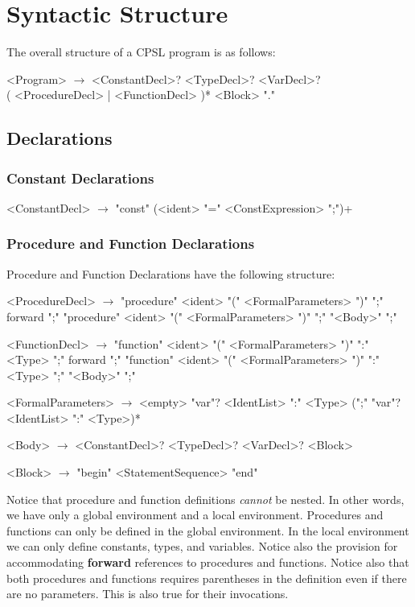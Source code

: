 \documentclass{book}
\begin{document}
\chapter{Syntactic Structure}
The overall structure of a CPSL program is as follows:
\begin{grammar}
<Program> $\rightarrow$ <ConstantDecl>? <TypeDecl>? <VarDecl>? \\
( <ProcedureDecl> | <FunctionDecl> )* <Block> "."
\end{grammar}

\section{Declarations}

\subsection{Constant Declarations}
\begin{grammar}
<ConstantDecl> $\rightarrow$ "const" (<ident> "=" <ConstExpression> ";")+
\end{grammar}

\subsection{Procedure and Function Declarations}
Procedure and Function Declarations have the following structure:
\begin{grammar}
<ProcedureDecl>  $\rightarrow$ 
"procedure" <ident> "(" <FormalParameters> ")" ";" forward ";"
\alt "procedure" <ident> "(" <FormalParameters> ")" ";" "<Body>" ";"

<FunctionDecl>  $\rightarrow$ 
"function" <ident> "(" <FormalParameters> ")" ":" <Type> ";" forward ";"
\alt "function" <ident> "(" <FormalParameters> ")" ":" <Type>  ";" "<Body>" ";"

<FormalParameters> $\rightarrow$ <empty>
\alt "var"? <IdentList> ":" <Type> (";" "var"? <IdentList> ":" <Type>)*

<Body> $\rightarrow$ <ConstantDecl>? <TypeDecl>? <VarDecl>? <Block>

<Block> $\rightarrow$ "begin" <StatementSequence> "end"
\end{grammar}

Notice that procedure and function definitions \textit{cannot} be nested.  In other words, we have only a global environment and a local environment.  Procedures and functions can only be defined in the global environment.  In the local environment we can only define constants, types, and variables.  Notice also the provision for accommodating \textbf{forward} references to procedures and functions.  Notice also that both procedures and functions requires parentheses in the definition even if there are no parameters.  This is also true for their invocations.
\end{document}
